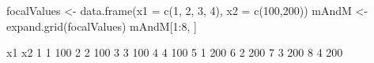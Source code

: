 \begin{Schunk}
\begin{Sinput}
 focalValues <- data.frame(x1 = c(1, 2, 3, 4), x2 = c(100,200))
 mAndM <- expand.grid(focalValues)
 mAndM[1:8, ]
\end{Sinput}
\begin{Soutput}
  x1  x2
1  1 100
2  2 100
3  3 100
4  4 100
5  1 200
6  2 200
7  3 200
8  4 200
\end{Soutput}
\end{Schunk}
